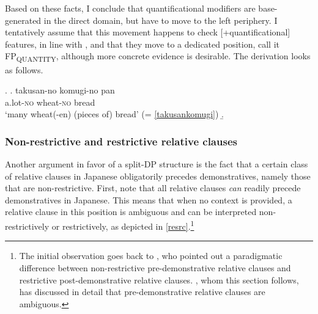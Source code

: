 \documentclass [output=book,colorlinks,citecolor=brown]{langscibook}
\begin{document}
Based on these facts, I conclude that quantificational modifiers are base-generated in the direct domain, but have to move to the left periphery. I tentatively assume that this movement happens to check [+quantificational] features, in line with \citet{kim:2019:syntax}, and that they move to a dedicated position, call it FP\textsubscript{QUANTITY}, although more concrete evidence is desirable. The derivation looks as follows.

\newpage

\ex. \ag. takusan-no komugi-no pan\\
a.lot-\textsc{no} wheat-\textsc{no} bread\\
`many wheat(-en) (pieces of) bread’ (= \ref{takusankomugi})
\b. \hspace{-2cm} 

\subsubsection{Non-restrictive and restrictive relative clauses} \label{RC LP}

Another argument in favor of a split-DP structure is the fact that a certain class of relative clauses in Japanese obligatorily precedes demonstratives, namely those that are non-restrictive. First, note that all relative clauses \textit{can} readily precede demonstratives in Japanese. This means that when no context is provided, a relative clause in this position is ambiguous and can be interpreted non-restrictively or restrictively, as depicted in \ref{resrc}.\footnote{The initial observation goes back to \citet{kamio:1977:restrictive}, who pointed out a paradigmatic difference between non-restrictive pre-demonstrative relative clauses and restrictive post-demonstrative relative clauses. \citet{ishizuka:2008:RC}, whom this section follows, has discussed in detail that pre-demonstrative relative clauses are ambiguous.} %
\end{document}
